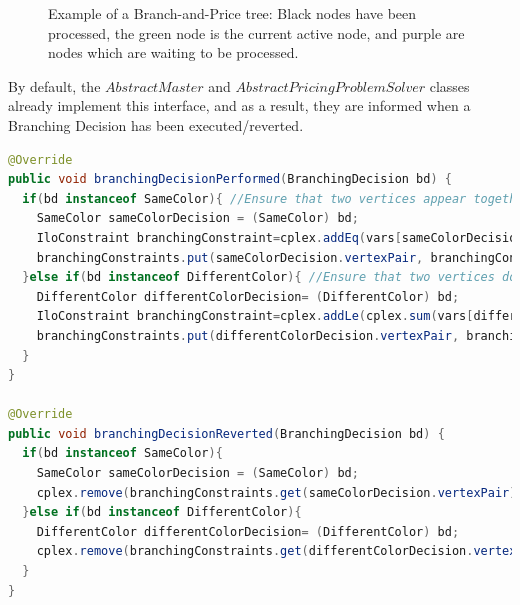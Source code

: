 \documentclass[a4paper]{article}
\newenvironment{myblock}[1]{%
    \tcolorbox[beamer,%
    noparskip,breakable,
    colback=lightBlueCodeBlock,colframe=darkBlueCodeBlock,%
    colbacklower=darkBlueCodeBlock!75!lightBlueCodeBlock,%
    coltitle=blueTitleCodeBlock,
    title=#1]}%
    {\endtcolorbox}
\begin{document}
\begin{figure}[width=5cm]
\centering
{}
\caption{Example of a Branch-and-Price tree: Black nodes have been processed, the green node is the current active node, and purple are nodes which are waiting to be processed.}
\label{fig:bap_tree}
\end{figure}
By default, the $AbstractMaster$ and $AbstractPricingProblemSolver$ classes already implement this interface, and as a result, they are informed when a Branching Decision has been executed/reverted.\\
\begin{myblock}{ExactPricingProblemSolver continued}
\begin{lstlisting}[language=java, style=eclipseArticle, xleftmargin=2em]  
@Override
public void branchingDecisionPerformed(BranchingDecision bd) {
  if(bd instanceof SameColor){ //Ensure that two vertices appear together in an independent set
    SameColor sameColorDecision = (SameColor) bd;
    IloConstraint branchingConstraint=cplex.addEq(vars[sameColorDecision.vertexPair.getFirst()], vars[sameColorDecision.vertexPair.getSecond()]);
    branchingConstraints.put(sameColorDecision.vertexPair, branchingConstraint);
  }else if(bd instanceof DifferentColor){ //Ensure that two vertices do NOT appear together in an independent set.
    DifferentColor differentColorDecision= (DifferentColor) bd;
    IloConstraint branchingConstraint=cplex.addLe(cplex.sum(vars[differentColorDecision.vertexPair.getFirst()], vars[differentColorDecision.vertexPair.getSecond()]), 1);
    branchingConstraints.put(differentColorDecision.vertexPair, branchingConstraint);
  }
}

@Override
public void branchingDecisionReverted(BranchingDecision bd) {
  if(bd instanceof SameColor){
    SameColor sameColorDecision = (SameColor) bd;
    cplex.remove(branchingConstraints.get(sameColorDecision.vertexPair));
  }else if(bd instanceof DifferentColor){
    DifferentColor differentColorDecision= (DifferentColor) bd;
    cplex.remove(branchingConstraints.get(differentColorDecision.vertexPair));
  }
}
\end{lstlisting}
\end{myblock}
\end{document}
